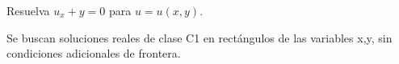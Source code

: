 Resuelva $u_x+y=0$ para $u=u(x,y)$.

Se buscan soluciones reales de clase C1 en rectángulos de las variables x,y, sin condiciones adicionales de frontera.
